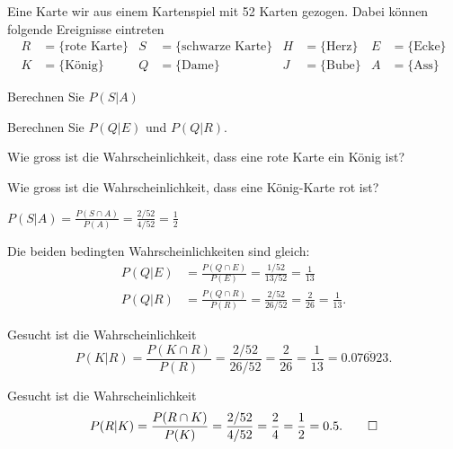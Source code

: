 Eine Karte wir aus einem Kartenspiel mit 52 Karten gezogen.
Dabei können folgende Ereignisse eintreten
\begin{align*}
R&=\{\text{rote Karte}\}
&
S&=\{\text{schwarze Karte}\}
&
H&=\{\text{Herz}\}
&
E&=\{\text{Ecke}\}
\\
K&=\{\text{König}\}
&
Q&=\{\text{Dame}\}
&
J&=\{\text{Bube}\}
&
A&=\{\text{Ass}\}
\end{align*}
\begin{teilaufgaben}
\item
Berechnen Sie $P(S|A)$
\item
Berechnen Sie
$P(Q|E)$
und
$P(Q|R)$.
\item
Wie gross ist die Wahrscheinlichkeit, dass eine rote Karte ein
König ist?
\item
Wie gross ist die Wahrscheinlichkeit, dass eine König-Karte rot ist?
\end{teilaufgaben}

\begin{loesung}
\begin{teilaufgaben}
\item
$
\displaystyle
P(S|A)
=
\frac{P(S\cap A)}{P(A)}
=
\frac{2/52}{4/52}
=
\frac12
$
\item
Die beiden bedingten Wahrscheinlichkeiten sind gleich:
\begin{align*}
P(Q|E)
&=
\frac{P(Q\cap E)}{P(E)} = \frac{1/52}{13/52} = \frac{1}{13}
\\
P(Q|R)
&=
\frac{P(Q\cap R)}{P(R)} = \frac{2/52}{26/52} = \frac{2}{26}
= \frac{1}{13}.
\end{align*}
\item
Gesucht ist die Wahrscheinlichkeit
\[
P(K|R)
=
\frac{P(K\cap R)}{P(R)}
=
\frac{2/52}{26/52}
=
\frac{2}{26}
=
\frac{1}{13}
=
0.\overline{076923}.
\]
\item
Gesucht ist die Wahrscheinlichkeit
\[
P(R|K)
=
\frac{P(R\cap K)}{P(K)}
=
\frac{2/52}{4/52}
=
\frac{2}{4}
=
\frac{1}{2}
=
0.5.
\qedhere
\]
\end{teilaufgaben}
\end{loesung}

